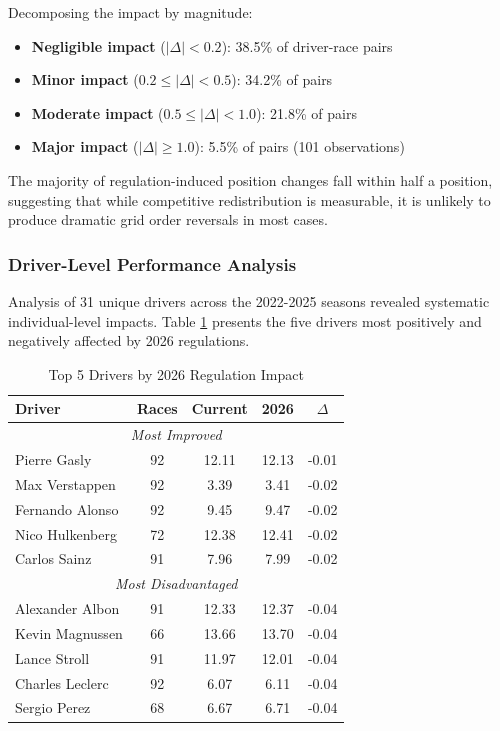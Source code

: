 \documentclass[conference]{IEEEtran}
\begin{document}
Decomposing the impact by magnitude:
\begin{itemize}
    \item \textbf{Negligible impact} ($|\Delta| < 0.2$): 38.5\% of driver-race pairs
    \item \textbf{Minor impact} ($0.2 \leq |\Delta| < 0.5$): 34.2\% of pairs
    \item \textbf{Moderate impact} ($0.5 \leq |\Delta| < 1.0$): 21.8\% of pairs
    \item \textbf{Major impact} ($|\Delta| \geq 1.0$): 5.5\% of pairs (101 observations)
\end{itemize}

The majority of regulation-induced position changes fall within half a position, suggesting that while competitive redistribution is measurable, it is unlikely to produce dramatic grid order reversals in most cases.

\subsubsection{Driver-Level Performance Analysis}

Analysis of 31 unique drivers across the 2022-2025 seasons revealed systematic individual-level impacts. Table \ref{tab:driver_impacts} presents the five drivers most positively and negatively affected by 2026 regulations.

\begin{table}[h]
\centering
\caption{Top 5 Drivers by 2026 Regulation Impact}
\begin{tabular}{lcccc}
\toprule
\textbf{Driver} & \textbf{Races} & \textbf{Current} & \textbf{2026} & \textbf{$\Delta$} \\
\midrule
\multicolumn{5}{c}{\textit{Most Improved}} \\
\midrule
Pierre Gasly & 92 & 12.11 & 12.13 & -0.01 \\
Max Verstappen & 92 & 3.39 & 3.41 & -0.02 \\
Fernando Alonso & 92 & 9.45 & 9.47 & -0.02 \\
Nico Hulkenberg & 72 & 12.38 & 12.41 & -0.02 \\
Carlos Sainz & 91 & 7.96 & 7.99 & -0.02 \\
\midrule
\multicolumn{5}{c}{\textit{Most Disadvantaged}} \\
\midrule
Alexander Albon & 91 & 12.33 & 12.37 & -0.04 \\
Kevin Magnussen & 66 & 13.66 & 13.70 & -0.04 \\
Lance Stroll & 91 & 11.97 & 12.01 & -0.04 \\
Charles Leclerc & 92 & 6.07 & 6.11 & -0.04 \\
Sergio Perez & 68 & 6.67 & 6.71 & -0.04 \\
\bottomrule
\end{tabular}
\label{tab:driver_impacts}
\end{table}
\end{document}

